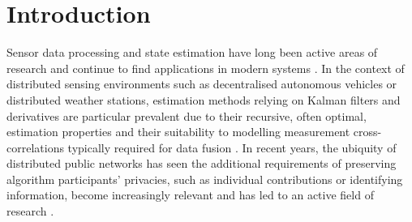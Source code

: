 \documentclass[conference]{IEEEtran}
\theoremstyle{definition}
\theoremstyle{remark}
\begin{document}

\IEEEpeerreviewmaketitle

% 
%                                                        
%                                                        
%                                                        
% 

\section{Introduction}\label{sec:intro}
Sensor data processing and state estimation have long been active areas of research and continue to find applications in modern systems \cite{andersonOptimalFiltering1979,simonOptimalStateEstimation2006}. In the context of distributed sensing environments such as decentralised autonomous vehicles or distributed weather stations, estimation methods relying on Kalman filters and derivatives \cite{haugBayesianEstimationTracking2012} are particular prevalent due to their recursive, often optimal, estimation properties and their suitability to modelling measurement cross-correlations typically required for data fusion \cite{mutambaraDecentralizedEstimationControl1998,ligginsDistributedDataFusion2012}. In recent years, the ubiquity of distributed public networks has seen the additional requirements of preserving algorithm participants' privacies, such as individual contributions or identifying information, become increasingly relevant and has led to an active field of research \cite{renSecurityChallengesPublic2012,brennerSecretProgramExecution2011}.
\end{document}
